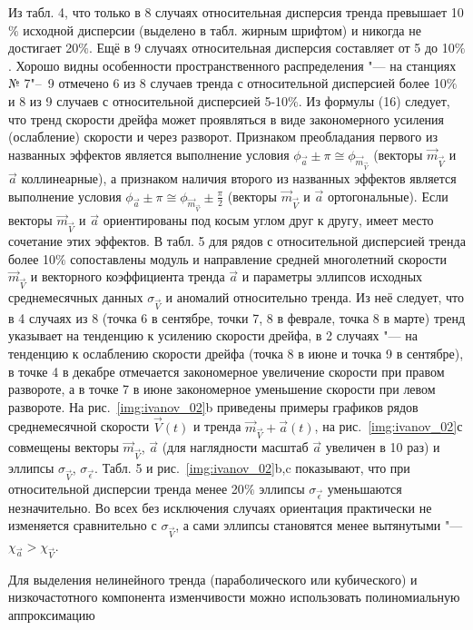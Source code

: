 {{Из табл. 4, что только в 8 случаях относительная дисперсия тренда превышает 10$\%$ исходной дисперсии (выделено в табл. жирным шрифтом) и никогда не достигает 20$\%$. Ещё в 9 случаях относительная дисперсия составляет от 5 до 10$\%$. Хорошо видны особенности пространственного распределения "--- на станциях № 7"--~9 отмечено 6 из 8 случаев тренда с относительной дисперсией более 10$\%$ и 8 из 9 случаев с относительной дисперсией 5-10$\%$.
Из формулы (16) следует, что тренд скорости дрейфа может проявляться в виде закономерного усиления (ослабление) скорости и через разворот. Признаком преобладания первого из названных эффектов является выполнение условия $\phi_{\vec{a}}\pm\pi\cong\phi_{\vec{m}_\vec{V}}$ (векторы $\vec{m}_{\vec{V}}$ и $\vec{a}$ коллинеарные), а признаком наличия второго из названных эффектов является выполнение условия $\phi_{\vec{a}}\pm\pi\cong{\phi_{\vec{m}_\vec{V}}}\pm\frac{\pi}{2}$ (векторы $\vec{m}_{\vec{V}}$ и $\vec{a}$ ортогональные). Если векторы $\vec{m}_{\vec{V}}$ и $\vec{a}$ ориентированы под косым углом друг к другу, имеет место сочетание этих эффектов.
В табл. 5 для рядов с относительной дисперсией тренда более 10$\%$ сопоставлены модуль и направление средней многолетний скорости $\vec{m}_{\vec{V}}$ и векторного коэффициента тренда $\vec{a}$ и параметры эллипсов исходных среднемесячных данных $\sigma_{\vec{V}}$ и аномалий относительно тренда. Из неё следует, что в 4 случаях из 8 (точка 6 в сентябре, точки 7, 8 в феврале, точка 8 в марте) тренд указывает на тенденцию к усилению скорости дрейфа, в 2 случаях "--- на тенденцию к ослаблению скорости дрейфа (точка 8 в июне и точка 9 в сентябре), в точке 4 в декабре отмечается закономерное увеличение скорости при правом развороте, а в точке 7 в июне закономерное уменьшение скорости при левом развороте. На рис.~\ref{img:ivanov_02}b приведены примеры графиков рядов среднемесячной скорости $\vec{V}(t)$ и тренда $\vec{m}_{\vec{V}}+{\vec{a}(t)}$, на рис.~\ref{img:ivanov_02}с совмещены векторы $\vec{m}_{\vec{V}}$, $\vec{a}$ (для наглядности масштаб $\vec{a}$ увеличен в 10 раз) и эллипсы  $\sigma_{\vec{V}}$,  $\sigma_{\vec{\epsilon}}$. Табл. 5 и рис.~\ref{img:ivanov_02}b,c показывают, что при относительной дисперсии тренда менее 20$\%$ эллипсы $\sigma_{\vec{\epsilon}}$ уменьшаются незначительно. Во всех без исключения случаях  ориентация практически не изменяется сравнительно с $\sigma_{\vec{V}}$,  а сами эллипсы становятся менее вытянутыми "--- $\chi_{\vec{a}}>\chi_{\vec{V}}$.  


Для выделения нелинейного тренда (параболического или кубического) и низкочастотного компонента изменчивости можно использовать полиномиальную аппроксимацию

}}
